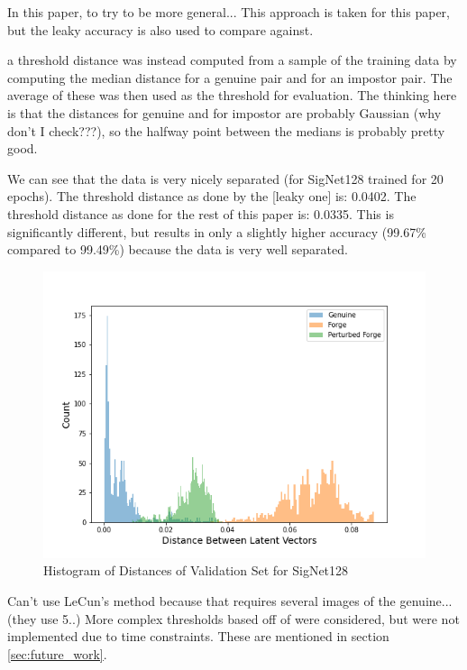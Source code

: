 In this paper, 
to try to be more general...
This approach is taken for this paper, but the leaky accuracy is also used to compare against.

a threshold distance was instead computed from a sample of the training data by computing the median distance for a genuine pair and for an impostor pair.
The average of these was then used as the threshold for evaluation.
The thinking here is that the distances for genuine and for impostor are probably Gaussian (why don't I check???), so the halfway point between the medians is probably pretty good.

We can see that the data is very nicely separated (for SigNet128 trained for 20 epochs).
The threshold distance as done by the [leaky one] is: 0.0402.
The threshold distance as done for the rest of this paper is: 0.0335.
This is significantly different, but results in only a slightly higher accuracy (99.67\% compared to 99.49\%) because the data is very well separated.
\begin{figure}[h]
    \begin{center}
        \includegraphics[width=0.8\linewidth]{distance_histogram_signet_128.png}
    \end{center}
    \caption{Histogram of Distances of Validation Set for SigNet128}
    \label{fig:hist_distances}
\end{figure}

Can't use LeCun's method because that requires several images of the genuine... (they use 5..)
More complex thresholds based off of \cite{LeCun} were considered, but were not implemented due to time constraints.
These are mentioned in section \ref{sec:future_work}.



